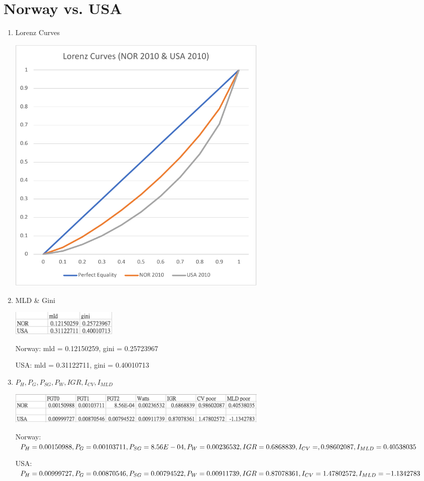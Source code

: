 \documentclass{article}[13pt]
\begin{document}
\newpage


\section{Norway vs. USA}

\begin{enumerate}
    \item{Lorenz Curves}
    
    \includegraphics[width=5in]{nor_usa_lorenz.pdf}

    \item{MLD \& Gini}
    
    \includegraphics[width=2in]{nor_usa_2.png}

    Norway: mld = 0.12150259, gini = 0.25723967

    USA: mld = 0.31122711, gini = 0.40010713

    \item{$P_H, P_G, P_{SG}, P_W, IGR, I_{CV}, I_{MLD}$}

    \includegraphics[width=5in]{nor_usa_1.png}

    Norway: $P_H = 0.00150988, P_G = 0.00103711, P_{SG} = 8.56E-04, P_W = 0.00236532, \newline IGR = 0.6868839, I_{CV} = ,0.98602087, I_{MLD} = 0.40538035$

    USA: $P_H = 0.00999727, P_G = 0.00870546, P_{SG} = 0.00794522, P_W = 0.00911739, \newline IGR = 0.87078361, I_{CV} = 1.47802572, I_{MLD} = -1.1342783$

\end{enumerate}
\end{document}
